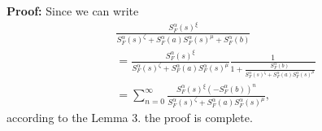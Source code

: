 \documentclass[12pt]{article}
\begin{document}
\textbf{Proof:} Since we can write
\begin{align}\label{mand2}
 & \frac{S_{F}^{\alpha}(s)^{\xi}}{S_{F}^{\alpha}(s)^{\zeta}+S_{F}^{\alpha}(a)S_{F}^{\alpha}(s)^{\mu}+S_{F}^{\alpha}(b)}\nonumber\\&=
  \frac{S_{F}^{\alpha}(s)^{\xi}}{S_{F}^{\alpha}(s)^{\zeta}+S_{F}^{\alpha}(a)S_{F}^{\alpha}(s)^{\mu}}\frac{1}{1+\frac{S_{F}^{\alpha}(b)}
  {S_{F}^{\alpha}(s)^{\zeta}+
  S_{F}^{\alpha}(a)S_{F}^{\alpha}(s)^{\mu}}}\nonumber\\&=\sum_{n=0}^{\infty}\frac{S_{F}^{\alpha}(s)^\xi (-S_{F}^{\alpha}(b))^n}{S_{F}^{\alpha}(s)^{\zeta}+
  S_{F}^{\alpha}(a)S_{F}^{\alpha}(s)^{\mu}},
\end{align}
according to the  Lemma 3. the proof is complete.\\
\end{document}
